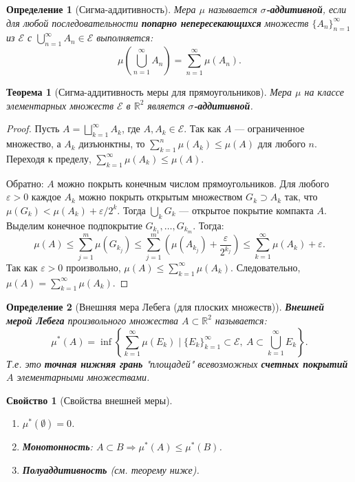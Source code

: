 \documentclass[a4paper, 12pt]{article}
\newtheorem{definition}{Определение}
\newtheorem{theorem}{Теорема}
\newtheorem{property}{Свойство}
\newcommand{\R}{\mathbb{R}}
\newcommand{\1}{\mathbf{1}}
\begin{document}
\begin{definition}[Сигма-аддитивность]
    Мера $\mu$ называется \textbf{$\sigma$-аддитивной}, если для любой последовательности \textbf{попарно непересекающихся} множеств $\{A_n\}_{n=1}^{\infty}$ из $\mathcal{E}$ с $\bigcup_{n=1}^{\infty} A_n \in \mathcal{E}$ выполняется:
    \[
    \mu\left( \bigcup_{n=1}^{\infty} A_n \right) = \sum_{n=1}^{\infty} \mu(A_n).
    \]
\end{definition}

\begin{theorem}[Сигма-аддитивность меры для прямоугольников]
    Мера $\mu$ на классе элементарных множеств $\mathcal{E}$ в $\R^2$ является \textbf{$\sigma$-аддитивной}.
\end{theorem}

\begin{proof}
    Пусть $A = \bigsqcup_{k=1}^{\infty} A_k$, где $A, A_k \in \mathcal{E}$. Так как $A$ — ограниченное множество, а $A_k$ дизъюнктны, то $\sum_{k=1}^n \mu(A_k) \leq \mu(A)$ для любого $n$. Переходя к пределу, $\sum_{k=1}^{\infty} \mu(A_k) \leq \mu(A)$. 
    
    Обратно: $A$ можно покрыть конечным числом прямоугольников. Для любого $\varepsilon > 0$ каждое $A_k$ можно покрыть открытым множеством $G_k \supset A_k$ так, что $\mu(G_k) < \mu(A_k) + \varepsilon / 2^k$. Тогда $\bigcup_k G_k$ — открытое покрытие компакта $A$. Выделим конечное подпокрытие $G_{k_1}, \dots, G_{k_m}$. Тогда:
    \[
    \mu(A) \leq \sum_{j=1}^m \mu(G_{k_j}) \leq \sum_{j=1}^m \left( \mu(A_{k_j}) + \frac{\varepsilon}{2^{k_j}} \right) \leq \sum_{k=1}^{\infty} \mu(A_k) + \varepsilon.
    \]
    Так как $\varepsilon > 0$ произвольно, $\mu(A) \leq \sum_{k=1}^{\infty} \mu(A_k)$. Следовательно, $\mu(A) = \sum_{k=1}^{\infty} \mu(A_k)$.
\end{proof}

\begin{definition}[Внешняя мера Лебега (для плоских множеств)]
    \textbf{Внешней мерой Лебега} произвольного множества $A \subset \R^2$ называется:
    \[
    \mu^*(A) = \inf \left\{ \sum_{k=1}^{\infty} \mu(E_k) \mid \{E_k\}_{k=1}^{\infty} \subset \mathcal{E},\ A \subset \bigcup_{k=1}^{\infty} E_k \right\}.
    \]
    Т.е. это \textbf{точная нижняя грань} "площадей" всевозможных \textbf{счетных покрытий} $A$ элементарными множествами.
\end{definition}

\begin{property}[Свойства внешней меры]
    \hfill
    \begin{enumerate}[label=(\arabic*)]
        \item $\mu^*(\emptyset) = 0$.
        \item \textbf{Монотонность}: $A \subset B \Rightarrow \mu^*(A) \leq \mu^*(B)$.
        \item \textbf{Полуаддитивность} (см. теорему ниже).
    \end{enumerate}
\end{property}
\end{document}
